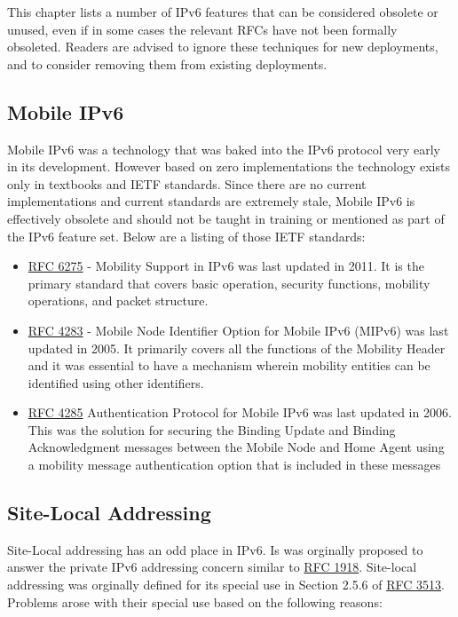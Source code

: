 \documentclass[
]{article}
\providecommand{\tightlist}{%
  \setlength{\itemsep}{0pt}\setlength{\parskip}{0pt}}
\begin{document}
This chapter lists a number of IPv6 features that can be considered
obsolete or unused, even if in some cases the relevant RFCs have not
been formally obsoleted. Readers are advised to ignore these techniques
for new deployments, and to consider removing them from existing
deployments.

\subsection{Mobile IPv6}\label{mobile-ipv6}

Mobile IPv6 was a technology that was baked into the IPv6 protocol very
early in its development. However based on zero implementations the
technology exists only in textbooks and IETF standards. Since there are
no current implementations and current standards are extremely stale,
Mobile IPv6 is effectively obsolete and should not be taught in training
or mentioned as part of the IPv6 feature set. Below are a listing of
those IETF standards:

\begin{itemize}
\tightlist
\item
  \href{https://www.rfc-editor.org/rfc/rfc6275.html}{RFC 6275} -
  Mobility Support in IPv6 was last updated in 2011. It is the primary
  standard that covers basic operation, security functions, mobility
  operations, and packet structure.
\item
  \href{https://www.rfc-editor.org/rfc/rfc4283.html}{RFC 4283} - Mobile
  Node Identifier Option for Mobile IPv6 (MIPv6) was last updated in
  2005. It primarily covers all the functions of the Mobility Header and
  it was essential to have a mechanism wherein mobility entities can be
  identified using other identifiers.
\item
  \href{https://www.rfc-editor.org/info/rfc4285}{RFC 4285}
  Authentication Protocol for Mobile IPv6 was last updated in 2006. This
  was the solution for securing the Binding Update and Binding
  Acknowledgment messages between the Mobile Node and Home Agent using a
  mobility message authentication option that is included in these
  messages
\end{itemize}

\subsection{Site-Local Addressing}\label{site-local-addressing}

Site-Local addressing has an odd place in IPv6. Is was orginally
proposed to answer the private IPv6 addressing concern similar to
\href{https://www.rfc-editor.org/rfc/rfc1918.html}{RFC 1918}. Site-local
addressing was orginally defined for its special use in Section 2.5.6 of
\href{https://www.rfc-editor.org/rfc/rfc3513.html\#section-2.5.6}{RFC
3513}. Problems arose with their special use based on the following
reasons:
\end{document}

